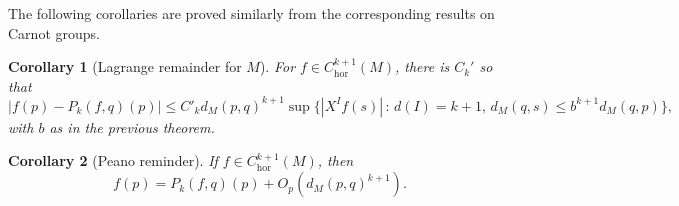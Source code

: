 \documentclass[12pt]{amsart}
\newtheorem{theorem}{Theorem}[section]
\newtheorem{corollary}{Corollary}[section]
\begin{document}
The following corollaries are proved similarly from the corresponding results on Carnot groups.
\begin{corollary}[Lagrange remainder for $M$]
   For  $ f\in C^{k+1}_{\mathrm{hor}}(M)$, there is $C_k'$ so that
  $$
    | f(p)- P_k( f,q)(p)| \leq C'_k d_M(p,q)^{k+1}
    \sup\{|X^I f(s)|\,:\, d(I)=k+1, \, d_M(q,s)\leq b^{k+1}d_M(q,p)\},
    $$
    with $b$ as in the previous theorem.
\end{corollary}

\begin{corollary}[Peano reminder]
   If $ f\in C^{k+1}_{\mathrm{hor}}(M)$, then
   $$
    f(p) =  P_k( f,q)(p) + O_{p}(d_M(p,q)^{k+1}).
   $$
\end{corollary}
\end{document}
